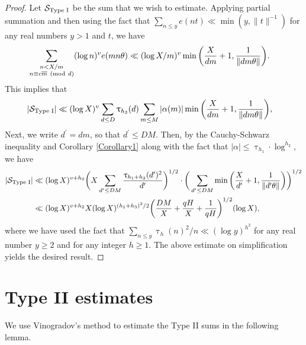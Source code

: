 \documentclass[12pt]{amsart}
\numberwithin{equation}{section}
\theoremstyle{remark}
\theoremstyle{definition}
\newcommand{\imod}[1]{\ (\mathrm{mod}\ #1)}
\begin{document}
\begin{proof}
Let $\mathcal{S}_{\textup{Type I}}$ be the sum that we wish to estimate. Applying partial summation and then using the fact that $\sum_{n\leq y}e(nt) \ll \min(y, \|t\|^{-1})$ for any real numbers $y>1$ and $t$, we have
\begin{align}
\notag \sum_{\substack{n< X/m\\n\equiv c\overline{m}\imod {d}}}(\log n)^ve(mn\theta)  &\ll (\log X/m)^v \min\bigg(\dfrac{X}{dm} + 1, \dfrac{1}{\|dm\theta\|}\bigg).
\end{align}
This implies that
\begin{align}
\notag |\mathcal{S}_{\textup{Type I}}|&\ll(\log X)^{v} \sum_{d\leq D}\uptau_{h_3}(d)\sum_{\substack{m\leq M}}|{\alpha}(m)|\min\bigg(\dfrac{X}{dm} + 1, \dfrac{1}{\lVert dm\theta\rVert}\bigg),
\end{align}
Next, we write $d^\prime =dm$, so that $d^\prime \leq DM$. Then, by the Cauchy-Schwarz inequality and Corollary \ref{Corollary1} along with the fact that $|{\alpha}| \leq \uptau_{h_1}\cdot \log^{h_2}$, we have
\begin{align}
\notag |\mathcal{S}_{\textup{Type I}}|   & \ll(\log X)^{v+h_2}\bigg(X\sum_{d^\prime \leq DM}\dfrac{\uptau_{h_1+h_3}(d^\prime)^2}{d^\prime}\bigg)^{1/2}\cdot \bigg(\sum_{d^\prime \leq DM}\min\bigg(\dfrac{X}{d^\prime} + 1, \dfrac{1}{\lVert d^\prime \theta\rVert}\bigg)\bigg)^{1/2}\\
\notag & \ll (\log X)^{v+h_2} X(\log X)^{(h_1+h_3)^2/2}\bigg(\dfrac{DM}{X}+ \dfrac{qH}{X} + \dfrac{1}{qH}\bigg)^{1/2}(\log X),
\end{align}
where we have used the fact that $\sum_{n\leq y}\uptau_h(n)^2/n \ll (\log y)^{h^2}$ for any real number $y\geq 2$ and for any integer $h\geq 1$. The above estimate on simplification yields the desired result.
\end{proof}


\section{Type II estimates}\label{sec: type II}

We use Vinogradov's method to estimate the Type II sums in the following lemma.
\end{document}
